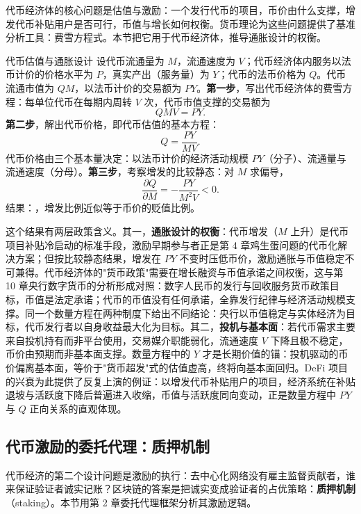 代币经济体的核心问题是估值与激励：一个发行代币的项目，币价由什么支撑，增发代币补贴用户是否可行，币值与增长如何权衡。货币理论为这些问题提供了基准分析工具：费雪方程式。本节把它用于代币经济体，推导通胀设计的权衡。

\begin{derivation}{代币估值与通胀设计}{}
设代币流通量为 $M$，流通速度为 $V$；代币经济体内服务以法币计价的价格水平为 $P$，真实产出（服务量）为 $Y$；代币的法币价格为 $Q$。代币流通市值为 $QM$，以法币计价的交易额为 $PY$。\textbf{第一步}，写出代币经济体的费雪方程：每单位代币在每期内周转 $V$ 次，代币市值支撑的交易额为
\[
QMV = PY.
\]
\textbf{第二步}，解出代币价格，即代币估值的基本方程：
\[
Q = \frac{PY}{MV}.
\]
代币价格由三个基本量决定：以法币计价的经济活动规模 $PY$（分子）、流通量与流通速度（分母）。\textbf{第三步}，考察增发的比较静态：对 $M$ 求偏导，
\[
\frac{\partial Q}{\partial M} = -\frac{PY}{M^{2}V} < 0.
\]
结果：，增发比例近似等于币价的贬值比例。
\end{derivation}

这个结果有两层政策含义。其一，\textbf{通胀设计的权衡}：代币增发（$M$ 上升）是代币项目补贴冷启动的标准手段，激励早期参与者正是第 4 章鸡生蛋问题的代币化解决方案；但按比较静态结果，增发在 $PY$ 不变时压低币价，激励通胀与币值稳定不可兼得。代币经济体的"货币政策"需要在增长融资与币值承诺之间权衡，这与第 10 章央行数字货币的分析形成对照：数字人民币的发行与回收服务货币政策目标，币值是法定承诺；代币的币值没有任何承诺，全靠发行纪律与经济活动规模支撑。同一个数量方程在两种制度下给出不同结论：央行以币值稳定与实体经济为目标，代币发行者以自身收益最大化为目标。其二，\textbf{投机与基本面}：若代币需求主要来自投机持有而非平台使用，交易媒介职能弱化，流通速度 $V$ 下降且极不稳定，币价由预期而非基本面支撑。数量方程中的 $Y$ 才是长期价值的锚：投机驱动的币价偏离基本面，等价于"货币超发"式的估值虚高，终将向基本面回归。DeFi 项目的兴衰为此提供了反复上演的例证：以增发代币补贴用户的项目，经济系统在补贴退坡与活跃度下降后普遍进入收缩，币值与活跃度同向变动，正是数量方程中 $PY$ 与 $Q$ 正向关系的直观体现。

\subsection{代币激励的委托代理：质押机制}

代币经济的第二个设计问题是激励的执行：去中心化网络没有雇主监督贡献者，谁来保证验证者诚实记账？区块链的答案是把诚实变成验证者的占优策略：\textbf{质押机制}（staking）。本节用第 2 章委托代理框架分析其激励逻辑。

